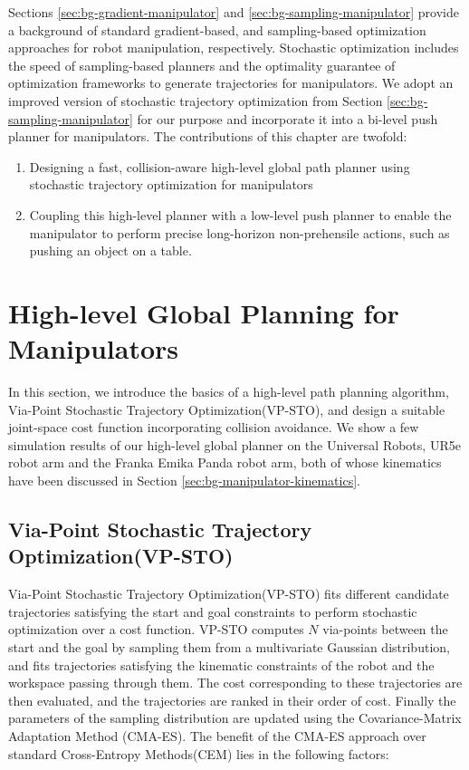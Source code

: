 Sections \ref{sec:bg-gradient-manipulator} and \ref{sec:bg-sampling-manipulator} provide a background of standard gradient-based, and sampling-based optimization approaches for robot manipulation, respectively. Stochastic optimization includes the speed of sampling-based planners and the optimality guarantee of optimization frameworks to generate trajectories for manipulators. We adopt an improved version of stochastic trajectory optimization from Section \ref{sec:bg-sampling-manipulator} for our purpose and incorporate it into a bi-level push planner for manipulators. The contributions of this chapter are twofold:

\begin{enumerate}
    \item Designing a fast, collision-aware high-level global path planner using stochastic trajectory optimization for manipulators
    \item Coupling this high-level planner with a low-level push planner to enable the manipulator to perform precise long-horizon non-prehensile actions, such as pushing an object on a table.
\end{enumerate}

\section{High-level Global Planning for Manipulators}

In this section, we introduce the basics of a high-level path planning algorithm, Via-Point Stochastic Trajectory Optimization(VP-STO)\cite{VP-STO}, and design a suitable joint-space cost function incorporating collision avoidance. We show a few simulation results of our high-level global planner on the Universal Robots, UR5e robot arm and the Franka Emika Panda robot arm, both of whose kinematics have been discussed in Section \ref{sec:bg-manipulator-kinematics}.


\subsection{Via-Point Stochastic Trajectory Optimization(VP-STO)}

Via-Point Stochastic Trajectory Optimization(VP-STO)\cite{VP-STO} fits different candidate trajectories satisfying the start and goal constraints to perform stochastic optimization over a cost function. VP-STO computes $N$ via-points between the start and the goal by sampling them from a multivariate Gaussian distribution, and fits trajectories satisfying the kinematic constraints of the robot and the workspace passing through them. The cost corresponding to these trajectories are then evaluated, and the trajectories are ranked in their order of cost. Finally the parameters of the sampling distribution are updated using the Covariance-Matrix Adaptation Method (CMA-ES). The benefit of the CMA-ES approach over standard Cross-Entropy Methods(CEM) lies in the following factors:

